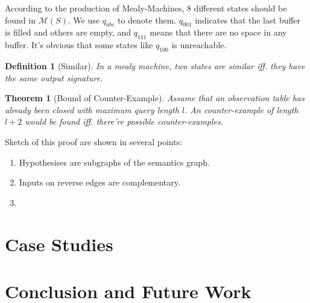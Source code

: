 \documentclass[conference, a4paper]{IEEEtran}
\newtheorem{theorem}{Theorem}
\newtheorem{definition}{Definition}
\begin{document}
According to the production of Mealy-Machines, 8 different states should be found in
$\mathcal{M}(S)$. We use $q_{abc}$ to denote them. $q_{001}$ indicates that the last buffer is
filled and others are empty, and $q_{111}$ means that there are no space in any buffer. It's
obvious that some states like $q_{100}$ is unreachable.

\begin{definition}[Similar]
  In a mealy machine, two states are similar iff. they have the same output signature.
\end{definition}

\begin{theorem}[Bound of Counter-Example]
  \label{the:cebound} Assume that an observation table has already been closed with maximum
  query length  $l$. An counter-example of length $l+2$ would be
  found iff. there're possible counter-examples.
\end{theorem}
\begin{IEEEproof}
  Sketch of this proof are shown in several points:
  \begin{enumerate}
    \item Hypothesises are subgraphs of the semantics graph.
    \item Inputs on reverse edges are complementary.
    \item 
  \end{enumerate}
\end{IEEEproof}

\section{Case Studies}

\section{Conclusion and Future Work}







\listoftodos
\end{document}
